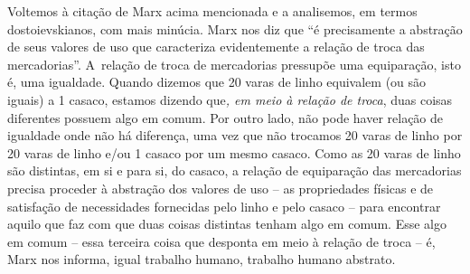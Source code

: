{Voltemos à citação de Marx acima mencionada e a analisemos, em termos
dostoievskianos, com mais minúcia. Marx nos diz que ``é precisamente a
abstração de seus valores de uso que caracteriza evidentemente a relação
de troca das mercadorias''. A~relação de troca de mercadorias pressupõe
uma equiparação, isto é, uma igualdade. Quando dizemos que 20 varas de
linho equivalem (ou são iguais) a 1 casaco, estamos dizendo que\emph{,
em meio à relação de troca}, duas coisas diferentes possuem algo em
comum. Por outro lado, não pode haver relação de igualdade onde não há
diferença, uma vez que não trocamos 20 varas de linho por 20 varas de
linho e/ou 1 casaco por um mesmo casaco. Como as 20 varas de linho são
distintas, em si e para si, do casaco, a relação de equiparação das
mercadorias precisa proceder à abstração dos valores de uso -- as
propriedades físicas e de satisfação de necessidades fornecidas pelo
linho e pelo casaco -- para encontrar aquilo que faz com que duas coisas
distintas tenham algo em comum. Esse algo em comum -- essa terceira
coisa que desponta em meio à relação de troca -- é, Marx nos informa,
igual trabalho humano, trabalho humano abstrato.

}
